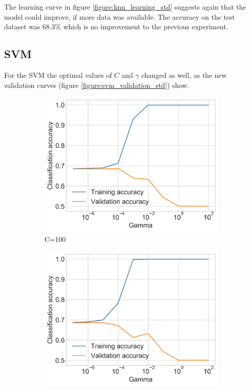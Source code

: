 The learning curve in figure \ref{figure:knn_learning_std} suggests again that the model could improve, if more data was available.
The accuracy on the test dataset was 68.3\% which is no improvement to the previous experiment.

\subsection{\acl{SVM}}
For the \ac{SVM} the optimal values of $C$ and $\gamma$ changed as well, as the new validation curves (figure \ref{figure:svm_validation_std}) show.
\begin{figure}[h]
    \begin{subfigure}{0.5\textwidth}
        \centering
        \includegraphics[width=\textwidth]{figures/charts/training_with_std/svm_validation_C_100.png}
        \caption{C=100}
        \label{figure:svm_validation_std_C_100}
    \end{subfigure}
    \begin{subfigure}{0.5\textwidth}
        \centering
        \includegraphics[width=\textwidth]{figures/charts/training_with_std/svm_validation_C_1000.png}

\end{subfigure}
\end{figure}
